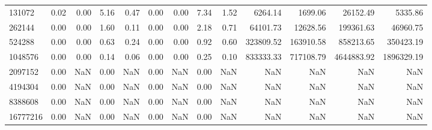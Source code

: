 \begin{tabular}{lrrrrrrrrrrrr}
131072 & 0.02 & 0.00 & 5.16 & 0.47 & 0.00 & 0.00 & 7.34 & 1.52 & 6264.14 & 1699.06 & 26152.49 & 5335.86 \\
262144 & 0.00 & 0.00 & 1.60 & 0.11 & 0.00 & 0.00 & 2.18 & 0.71 & 64101.73 & 12628.56 & 199361.63 & 46960.75 \\
524288 & 0.00 & 0.00 & 0.63 & 0.24 & 0.00 & 0.00 & 0.92 & 0.60 & 323809.52 & 163910.58 & 858213.65 & 350423.19 \\
1048576 & 0.00 & 0.00 & 0.14 & 0.06 & 0.00 & 0.00 & 0.25 & 0.10 & 833333.33 & 717108.79 & 4644883.92 & 1896329.19 \\
2097152 & 0.00 & NaN & 0.00 & NaN & 0.00 & NaN & 0.00 & NaN & NaN & NaN & NaN & NaN \\
4194304 & 0.00 & NaN & 0.00 & NaN & 0.00 & NaN & 0.00 & NaN & NaN & NaN & NaN & NaN \\
8388608 & 0.00 & NaN & 0.00 & NaN & 0.00 & NaN & 0.00 & NaN & NaN & NaN & NaN & NaN \\
16777216 & 0.00 & NaN & 0.00 & NaN & 0.00 & NaN & 0.00 & NaN & NaN & NaN & NaN & NaN \\
\bottomrule
\end{tabular}
